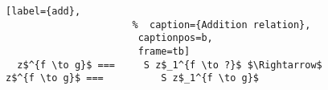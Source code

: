 \begin{figure}[!t]
  \centering
  \begin{minipage}{\columnwidth}
    \begin{lstlisting}[label={add},
                      %  caption={Addition relation},
                       captionpos=b,
                       frame=tb]
  z$^{f \to g}$ ===     S z$_1^{f \to ?}$ $\Rightarrow$ z$^{f \to g}$ ===          S z$_1^{f \to g}$
    \end{lstlisting}
  \end{minipage}
\end{figure}